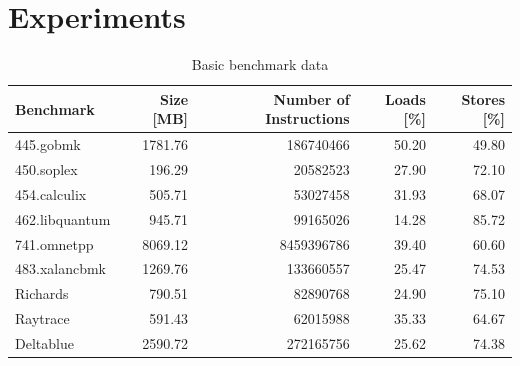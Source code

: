 \documentclass[onecolumn, openright, master, english, signatures]{dbrgrptt}
\begin{document}
\chapter{Experiments}\label{cha:experimetns}

\begin{table}[!ht]
  \centering
  \begin{tabular}[c]{lrrrr}
    \hline
    Benchmark & Size [MB] & Number of Instructions & Loads [\%] & Stores [\%] \tabularnewline
    \hline
    445.gobmk      & 1781.76 &  186740466 & 50.20 & 49.80 \tabularnewline
    450.soplex     &  196.29 &   20582523 & 27.90 & 72.10 \tabularnewline
    454.calculix   &  505.71 &   53027458 & 31.93 & 68.07 \tabularnewline
    462.libquantum &  945.71 &   99165026 & 14.28 & 85.72 \tabularnewline
    741.omnetpp    & 8069.12 & 8459396786 & 39.40 & 60.60 \tabularnewline
    483.xalancbmk  & 1269.76 &  133660557 & 25.47 & 74.53 \tabularnewline
    \hline
    Richards       &  790.51 &   82890768 & 24.90 & 75.10 \tabularnewline
    Raytrace       &  591.43 &   62015988 & 35.33 & 64.67 \tabularnewline
    Deltablue      & 2590.72 &  272165756 & 25.62 & 74.38 \tabularnewline
    \hline
  \end{tabular}
  \caption{Basic benchmark data}
  \label{tab:basic-benchmark-data}
\end{table}
\end{document}
